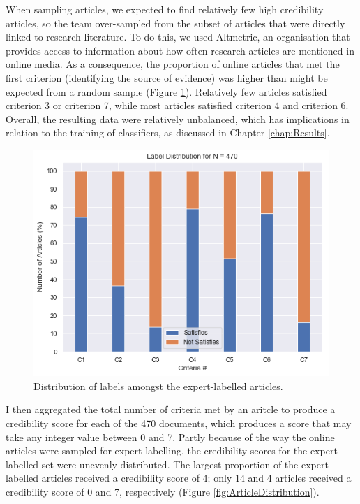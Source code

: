 \documentclass[a4paper,twoside,phd]{BYUPhys}
\begin{document}
When sampling articles, we expected to find relatively few high credibility articles, so the team over-sampled from the subset of articles that were directly linked to research literature. To do this, we used Altmetric, an organisation that provides access to information about how often research articles are mentioned in online media. As a consequence, the proportion of online articles that met the first criterion (identifying the source of evidence) was higher than might be expected from a random sample (Figure \ref{fig:LabelDistribution}). Relatively few articles satisfied criterion 3 or criterion 7, while most articles satisfied criterion 4 and criterion 6. Overall, the resulting data were relatively unbalanced, which has implications in relation to the training of classifiers, as discussed in Chapter \ref{chap:Results}.


\begin{figure}[H]
	\centering
	\includegraphics[totalheight=7cm]{images/label-distribution.png}
	\caption{Distribution of labels amongst the expert-labelled articles.}
	\label{fig:LabelDistribution}
\end{figure}


I then aggregated the total number of criteria met by an aritcle to produce a credibility score for each of the 470 documents, which produces a score that may take any integer value between 0 and 7. Partly because of the way the online articles were sampled for expert labelling, the credibility scores for the expert-labelled set were unevenly distributed. The largest proportion of the expert-labelled articles received a credibility score of 4; only 14 and 4 articles received a credibility score of 0 and 7, respectively (Figure \ref{fig:ArticleDistribution}).
\end{document}
